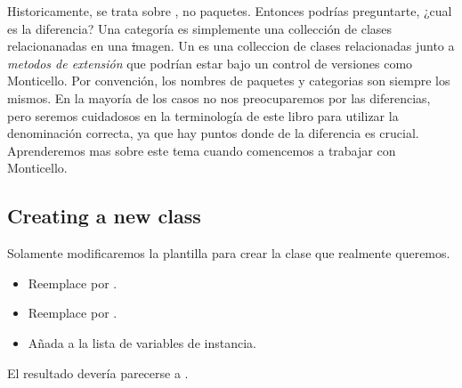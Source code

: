 \documentclass[a4paper,10pt,twoside]{book}
\begin{document}

Historicamente, se trata sobre , no paquetes.
Entonces podrías preguntarte, ¿cual es la diferencia?
Una categoría es simplemente una collección de clases relacionanadas en
una \st imagen.
Un  es una colleccion de clases relacionadas junto a
\emph{metodos de extensión} que podrían estar bajo un control de versiones
como Monticello.
Por convención, los nombres de paquetes y categorias son siempre los mismos.
En la mayoría de los casos no nos preocuparemos por las diferencias, pero
seremos cuidadosos en la terminología de este libro para utilizar la
denominación correcta, ya que hay puntos donde de la diferencia es crucial.
Aprenderemos mas sobre este tema cuando comencemos a trabajar con Monticello.


\subsection{Creating a new class}

Solamente modificaremos la plantilla para crear la clase que realmente queremos.

\begin{itemize}
  \item Reemplace  por .
  \item Reemplace  por .
  \item Añada  a la lista de variables de instancia.
\end{itemize}
El resultado devería parecerse a .
\end{document}

